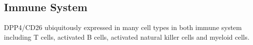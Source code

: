\subsection{Immune System}
DPP4/CD26 ubiquitously expressed in many cell types in both immune system including T cells, activated B cells, activated natural killer cells and myeloid cells. 